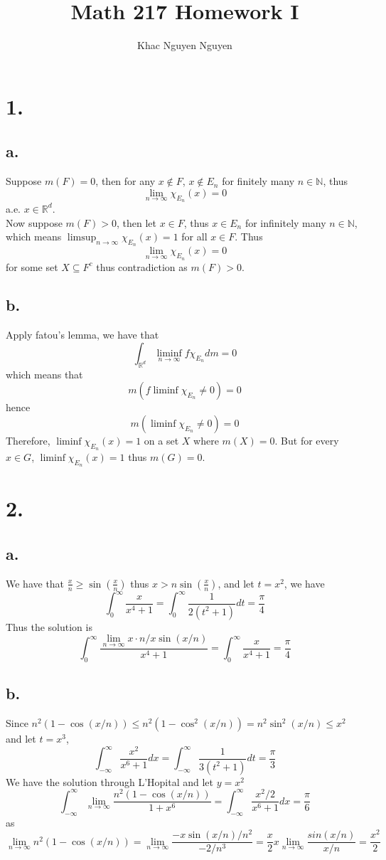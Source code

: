\documentclass[11pt]{article}
\title{\textbf{Math 217 Homework I}}
\author{Khac Nguyen Nguyen}
\date{}
\theoremstyle{mystyle}
\theoremstyle{definition}
\begin{document}
\section*{1.}
\subsection*{a.}
Suppose $m(F) = 0$, then for any $x \notin F$, $x \notin E_n$ for finitely many $n \in \mathbb{N}$, thus 
\[
  \lim_{n \to \infty} \chi_{E_n} (x) = 0
\]
a.e. $x \in \mathbb{R}^d$. \\
Now suppose $m(F) > 0$, then let $x \in F$, thus $x \in E_n$ for infinitely many $n \in \mathbb{N}$, which means $\limsup_{n \to \infty} \chi_{E_n} (x) = 1$ for all $x \in F$. Thus 
\[
  \lim_{n \to \infty} \chi_{E_n} (x) = 0
\]
for some set $X \subseteq F^c$ thus contradiction as $m(F) > 0$.  
\subsection*{b.}
Apply fatou's lemma, we have that 
\[
  \int_{\mathbb{R}^d} \liminf_{n \to \infty} f \chi_{E_n} dm = 0
\]
which means that 
\[
  m(f \liminf \chi_{E_n} \ne 0) = 0
\]
hence
\[
  m(\liminf \chi_{E_n} \ne 0) = 0
\]
Therefore, $\liminf \chi_{E_n}(x) = 1$ on a set $X$ where $m(X) = 0$. But for every $x \in G$, $\liminf \chi_{E_n}(x) = 1$ thus $m(G) = 0$. 
\newpage
\section*{2.}
\subsection*{a.}
We have that $\displaystyle\frac{x}{n} \ge \sin\left( \displaystyle\frac{x}{n}\right)$ thus $x > n\sin\left(\displaystyle\frac{x}{n}\right)$, and let $t = x^2$, we have 
\[
  \int_0^\infty \displaystyle\frac{x}{x^4+1} = \int_0^\infty \displaystyle\frac{1}{2(t^2+1)}dt = \displaystyle\frac{\pi}{4} 
\]
Thus the solution is 
\[
  \int_0^\infty \displaystyle\frac{\lim_{n \to \infty} x \cdot n/x \sin(x/n)}{x^4+1} = \int_0^\infty \displaystyle\frac{x}{x^4+1} = \displaystyle\frac{\pi}{4}
\]
\subsection*{b.}
Since $n^2(1-\cos(x/n)) \le n^2(1 - \cos^2(x/n)) = n^2 \sin^2(x/n) \le x^2$ and let $t = x^3$, 
\[
  \int_{-\infty}^\infty \displaystyle\frac{x^2}{x^6 + 1} dx = \int_{-\infty}^\infty \displaystyle\frac{1}{3(t^2+1)} dt = \displaystyle\frac{\pi}{3}
\]
We have the solution through L'Hopital and let $y = x^2$ 
\[
  \int_{-\infty}^\infty \lim_{n \to \infty} \displaystyle\frac{n^2(1-\cos(x/n))}{1+x^6} = \int_{-\infty}^\infty \displaystyle\frac{x^2/2}{x^6 + 1} dx = \displaystyle\frac{\pi}{6}
\]
as 
\[
  \lim_{n \to \infty} n^2(1-\cos(x/n)) = \lim_{n \to \infty} \displaystyle\frac{-x\sin(x/n)/n^2}{-2/n^3} = \displaystyle\frac{x}{2} x \lim_{n \to \infty} \displaystyle\frac{sin(x/n)}{x/n} = \displaystyle\frac{x^2}{2} 
\]
\newpage
\end{document}
